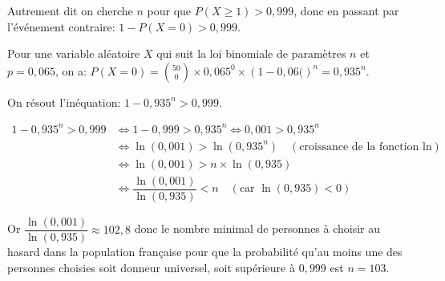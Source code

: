 \documentclass[10pt]{article}
\begin{document}
\begin{enumerate}
Autrement dit on cherche $n$ pour que $P\left (X\geqslant 1\right ) > 0,999$, donc en passant par l'événement contraire: $1-P\left (X=0\right ) > 0,999$.

Pour une variable aléatoire $X$ qui suit la loi binomiale de paramètres $n$ et $p=0,065$, on a: $P\left (X=0\right ) = \displaystyle\binom{50}{0} \times 0,065^0 \times \left (1-0,06(\right )^{n}=0,935^n$.

On résout l'inéquation: $1-0,935^n > 0,999$.

$\begin{aligned}
1-0,935^n > 0,999
& \iff 1-0,999 > 0,935^n \iff 0,001 > 0,935^n\\
& \iff \ln \left ( 0,001\right ) > \ln \left ( 0,935^n\right ) \quad (\text{croissance de la fonction ln})\\
& \iff \ln \left ( 0,001\right ) > n\times \ln \left ( 0,935\right )\\
& \iff \dfrac{\ln \left ( 0,001\right )}{\ln \left ( 0,935\right )} < n \quad (\text{car }\ln\left (0,935\right )<0)
\end{aligned}$

Or $\dfrac{\ln \left ( 0,001\right )}{\ln \left ( 0,935\right )} \approx 102,8$ donc  le nombre minimal de personnes à choisir au hasard dans la population française pour que la probabilité qu'au moins une des personnes choisies soit donneur universel, soit supérieure à $0,999$ est $n=103$.
\end{enumerate}

\bigskip
\end{document}

